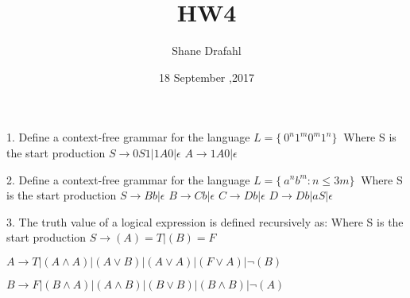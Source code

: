 \documentclass[11pt]{article}
\title{HW4}
\author{Shane Drafahl}
\date{18 September ,2017}
\begin{document}
    \maketitle

    1. Define a context-free grammar for the language $ L = \{\ 0^{n} 1^{m} 0^{m} 1^{n} \}\ $
    Where S is the start production
    $ S \rightarrow 0S1 | 1A0 | \epsilon $
    $ A \rightarrow 1A0 | \epsilon $

    2. Define a context-free grammar for the language $ L = \{\ a^{n}b^{m} : n \leq 3m \}\ $
    Where S is the start production
    $ S \rightarrow Bb | \epsilon $
    $ B \rightarrow Cb | \epsilon $
    $ C \rightarrow Db | \epsilon $
    $ D \rightarrow Db | aS | \epsilon $

    3. The truth value of a logical expression is defined recursively as:
    Where S is the start production
    $ S \rightarrow (A) = T | (B) = F $
    
    $ A \rightarrow T | (A \wedge A ) | (A \vee B) | (A \vee A) | (F \vee A) | \neg(B) $
    
    $ B \rightarrow F | (B \wedge A ) | (A \wedge B) | (B \vee B) | (B \wedge B) | \neg(A) $


    
\end{document}
